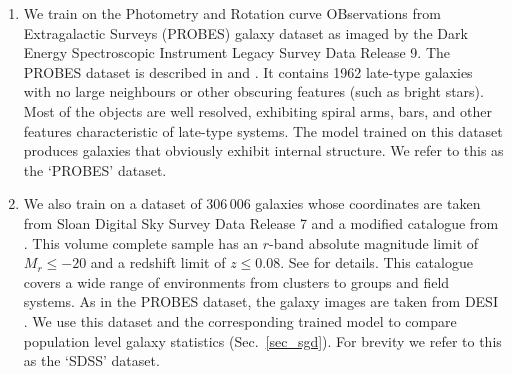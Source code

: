 \documentclass[fleqn,usenatbib]{mnras}
\begin{document}
\begin{enumerate}
    \item We train on the Photometry and Rotation curve OBservations  from
        Extragalactic Surveys (PROBES) galaxy dataset as imaged by the Dark
        Energy Spectroscopic Instrument \citep[DESI;][]{cite_desi} Legacy
        Survey Data Release 9. The PROBES dataset is described in
        \citet{cite_stone2019} and \citet{cite_stone2021a}. It contains 1962
        late-type galaxies with no large neighbours or other obscuring features
        (such as bright stars). Most of the objects are well resolved,
        exhibiting spiral arms, bars, and other features characteristic of
        late-type systems. The model trained on this dataset produces galaxies
        that obviously exhibit internal structure. We refer to this as the
        `PROBES' dataset.

    \item We also train on a dataset of 306\,006 galaxies whose coordinates are
        taken from Sloan Digital Sky Survey \citep[SDSS;][]{cite_sdss} Data
        Release 7 \citep{cite_sdssdr7} and a modified catalogue from
        \cite{cite_wilman2010}. This volume complete sample has an
        $r$-band absolute magnitude limit of $M_r\leq-20$ and a redshift limit
        of $z\leq0.08$. See \citet{cite_arora2019} for details.
        This catalogue covers a wide range of environments from clusters to
        groups and field systems. As in the PROBES dataset, the galaxy images
        are taken from DESI \citep{cite_desi}. We use this dataset and the
        corresponding trained model to compare population level galaxy
        statistics (Sec.~\ref{sec_sgd}). For brevity we refer to this as the
        `SDSS' dataset.
\end{enumerate}
\end{document}
